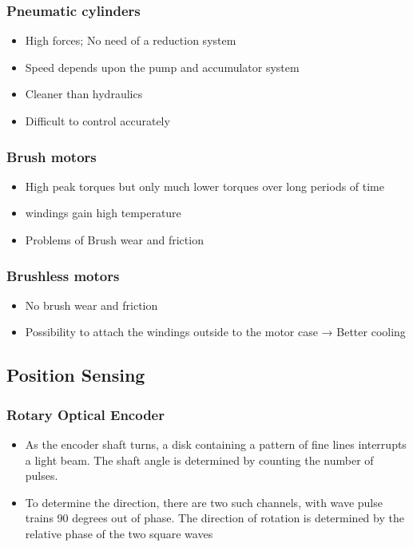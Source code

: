 \documentclass[10pt,a4paper]{article}
\begin{document}
\subsubsection{Pneumatic cylinders}
\begin{itemize}
	\item High forces; No need of a reduction system
	\item Speed depends upon the pump and accumulator system
	\item Cleaner than hydraulics
	\item Difficult to control accurately
\end{itemize}

\subsubsection{Brush motors}
\begin{itemize}
	\item High peak torques but only much lower torques over long periods of time
	\item windings gain high temperature
	\item Problems of Brush wear and friction
\end{itemize}

\subsubsection{Brushless motors}
\begin{itemize}
	\item No brush wear and friction
	\item Possibility to attach the windings outside to the motor case → Better cooling
\end{itemize}

\subsection{Position Sensing}
\subsubsection{Rotary Optical Encoder}
\begin{itemize}
	\item As the encoder shaft turns, a disk containing a pattern of fine lines interrupts a light beam. The shaft angle is determined by counting the number of pulses.
	\item To determine the direction, there are two such channels, with wave pulse trains 90 degrees out of phase. The direction of rotation is determined by the relative phase of the two square waves
\end{itemize}
\end{document}
